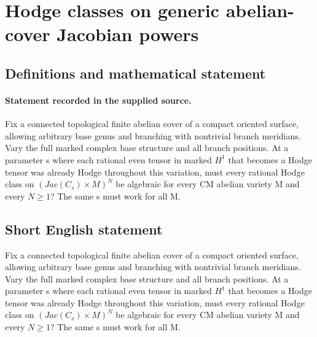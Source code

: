 \documentclass[11pt]{article}
\begin{document}
\section*{Hodge classes on generic abelian-cover Jacobian powers}\label{30007034}
\subsection{Definitions and mathematical statement}
\paragraph{Statement recorded in the supplied source.}
Fix a connected topological finite abelian cover of a compact oriented surface, allowing arbitrary base genus and branching with nontrivial branch meridians. Vary the full marked complex base structure and all branch positions. At a parameter s where each rational even tensor in marked $H^{1}$ that becomes a Hodge tensor was already Hodge throughout this variation, must every rational Hodge class on $(Jac(C_s)×M)^N$ be algebraic for every CM abelian variety M and every $N\geq 1$? The same s must work for all M.
\subsection{Short English statement}
Fix a connected topological finite abelian cover of a compact oriented surface, allowing arbitrary base genus and branching with nontrivial branch meridians. Vary the full marked complex base structure and all branch positions. At a parameter s where each rational even tensor in marked $H^{1}$ that becomes a Hodge tensor was already Hodge throughout this variation, must every rational Hodge class on $(Jac(C_s)×M)^N$ be algebraic for every CM abelian variety M and every $N\geq 1$? The same s must work for all M.
\end{document}
